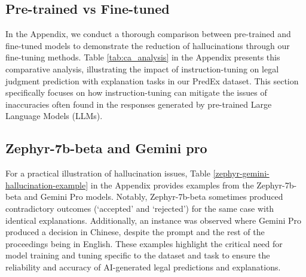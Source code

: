 \subsection{Pre-trained vs Fine-tuned}
In the Appendix, we conduct a thorough comparison between pre-trained and fine-tuned models to demonstrate the reduction of hallucinations through our fine-tuning methods. Table \ref{tab:ca_analysis} in the Appendix presents this comparative analysis, illustrating the impact of instruction-tuning on legal judgment prediction with explanation tasks in our PredEx dataset. This section specifically focuses on how instruction-tuning can mitigate the issues of inaccuracies often found in the responses generated by pre-trained Large Language Models (LLMs).

\subsection{Zephyr-7b-beta and Gemini pro}
For a practical illustration of hallucination issues, Table \ref{zephyr-gemini-hallucination-example} in the Appendix provides examples from the Zephyr-7b-beta and Gemini Pro models. Notably, Zephyr-7b-beta sometimes produced contradictory outcomes (`accepted' and `rejected') for the same case with identical explanations. Additionally, an instance was observed where Gemini Pro produced a decision in Chinese, despite the prompt and the rest of the proceedings being in English. These examples highlight the critical need for model training and tuning specific to the dataset and task to ensure the reliability and accuracy of AI-generated legal predictions and explanations.


